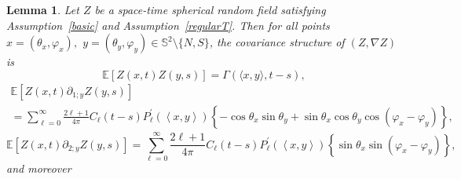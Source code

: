 \documentclass[10pt]{amsart}
\newtheorem{lemm}[theo]{Lemma}\newtheorem{prop}[theo]{Proposition}\newtheorem{coro}[theo]{Corollary}\newtheorem{conj}[theo]{Conjecture}
\theoremstyle{definition}\newtheorem{defi}[theo]{Definition}\newtheorem{rema}[theo]{Remark}\newtheorem{exam}[theo]{Example}\newtheorem{exem}[theo]{Example}\newtheorem{nota}[theo]{Notation}
\newcommand{\bbS}{\mathbb{S}}
\newcommand{\bbE}{\mathbb{E}}
\begin{document}
\begin{lemm}\label{lemcov}
Let $Z$ be a space-time spherical random field satisfying Assumption~\ref{basic} and Assumption~\ref{regularT}. Then for all points $x=(\theta _{x},\varphi _{x}),$ $y=(\theta _{y},\varphi _{y})\in \bbS^{2}\setminus \{N,S\}$, the covariance structure of $(Z, \nabla Z)$ is
\[
\bbE\left[Z(x,t)Z(y,s)\right] = \Gamma(\langle x, y\rangle, t-s),
\]
\begin{multline*}
\bbE\left[Z(x,t)\partial _{1;y}Z(y,s)\right]
\\
=\sum_{\ell =0}^{\infty }\frac{2\ell +1}{4\pi }C_{\ell }(t-s)P_{\ell }^{\prime }(\left\langle x,y\right\rangle)\left\{ -\cos \theta _{x}\sin
\theta _{y}+\sin \theta _{x}\cos \theta _{y}\cos (\varphi _{x}-\varphi _{y})\right\} \text{,}
\end{multline*}
\begin{equation*}
\bbE\left[Z(x,t)\partial _{2;y}Z(y,s)\right]
=\sum_{\ell =0}^{\infty }\frac{2\ell +1}{4\pi }C_{\ell }(t-s)P_{\ell }^{\prime }(\left\langle x,y\right\rangle)\left\{ \sin \theta _{x}\sin (\varphi _{x}-\varphi _{y})\right\} \text{,}
\end{equation*}
and moreover


\end{lemm}
\end{document}
